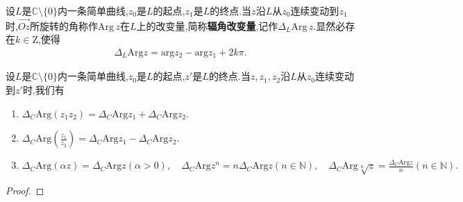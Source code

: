 \documentclass[../../main.tex]{subfiles}%
\begin{document}
\begin{definition}
设$L$是$\mathbb{C} \setminus \{0\}$内一条简单曲线,$z_0$是$L$的起点,$z_1$是$L$的终点.当$z$沿$L$从$z_0$连续变动到$z_1$时,$\overrightarrow{Oz}$所旋转的角称作$\mathrm{Arg}\, z$在$L$上的改变量,简称\textbf{辐角改变量},记作$\Delta_L \mathrm{Arg}\, z$.显然必存在$k\in \mathrm{Z}$,使得
\begin{align*}
\Delta _L\mathrm{Arg}z=\mathrm{arg}z_2-\mathrm{arg}z_1+2k\pi .
\end{align*}
\end{definition}

\begin{theorem}
设$L$是$\mathbb{C} \setminus \{0\}$内一条简单曲线,$z_0$是$L$的起点,$z'$是$L$的终点.当$z,z_1,z_2$沿$L$从$z_0$连续变动到$z'$时,我们有
\begin{enumerate}[(1)]
\item $\Delta _C\mathrm{Arg}(z_1z_2)=\Delta _C\mathrm{Arg}z_1+\Delta _C\mathrm{Arg}z_2.$

\item $\Delta _C\mathrm{Arg}\left( \frac{z_1}{z_2} \right) =\Delta _C\mathrm{Arg}z_1-\Delta _C\mathrm{Arg}z_2.$

\item $\Delta _C\mathrm{Arg}\left( \alpha z \right) =\Delta _C\mathrm{Arg}z\left( \alpha >0 \right) ,\quad \Delta _C\mathrm{Arg}z^n=n\Delta _C\mathrm{Arg}z\left( n\in \mathbb{N} \right) ,\quad \Delta _C\mathrm{Arg}\sqrt[n]{z}=\frac{\Delta _C\mathrm{Arg}z}{n}\left( n\in \mathbb{N} \right) .$
\end{enumerate}
\end{theorem}
\begin{proof}



\end{proof}
\end{document}
